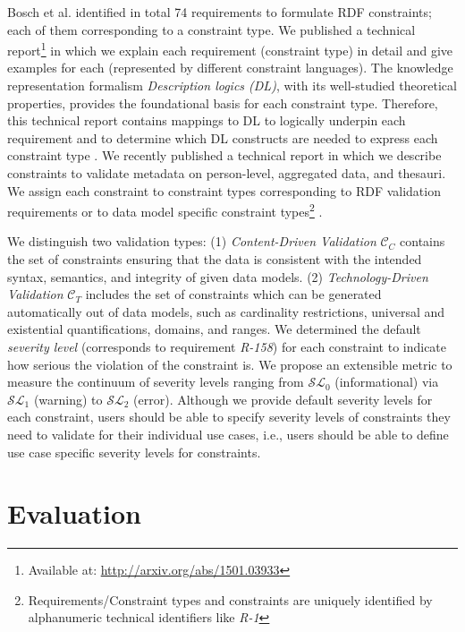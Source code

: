 \documentclass{llncs}
\begin{document}
Bosch et al. identified in total 74 requirements to formulate RDF constraints; each of them corresponding to a constraint type. 
We published a technical report\footnote{Available at: \url{http://arxiv.org/abs/1501.03933}} in which we explain each requirement (constraint type) in detail and give examples for each (represented by different constraint languages).
The knowledge representation formalism \emph{Description logics (DL)}, with its  well-studied theoretical properties, provides the foundational basis for each constraint type.
Therefore, this technical report contains mappings to DL to logically underpin each requirement and to determine which DL constructs are needed to express each constraint type \cite{BoschNolleAcarEckert2015}.
We recently published a technical report in which we describe constraints to validate metadata on person-level, aggregated data, and thesauri.
We assign each constraint to constraint types corresponding to RDF validation requirements or to data model specific constraint types\footnote{Requirements/Constraint types and constraints are uniquely identified by alphanumeric technical identifiers like \emph{R-1}}
\cite{BoschZapilkoWackerowEckert2015}.

We distinguish two validation types:
(1) \emph{Content-Driven Validation} $\mathcal{C}_{C}$ contains the set of constraints ensuring that the data is consistent with the intended syntax, semantics, and integrity of given data models.
(2) \emph{Technology-Driven Validation} $\mathcal{C}_{T}$ includes the set of constraints which can be generated automatically out of data models, such as cardinality restrictions, universal and existential quantifications, domains, and ranges.
We determined the default \emph{severity level} (corresponds to requirement \emph{R-158}) for each constraint to indicate how serious the violation of the constraint is.
We propose an extensible metric to measure the continuum of severity levels ranging from $\mathcal{SL}_{0}$ (informational) via $\mathcal{SL}_{1}$ (warning) to $\mathcal{SL}_{2}$ (error). 
Although we provide default severity levels for each constraint, users should be able to specify severity levels of constraints they need to validate for their individual use cases, i.e., users should be able to define use case specific severity levels for constraints.

\section{Evaluation}
\end{document}

